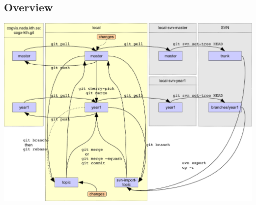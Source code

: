\documentclass[a4paper,10pt]{article}
\begin{document}
\subsection{Overview}
\includegraphics[width=\textwidth]{diagram}
\end{document}
